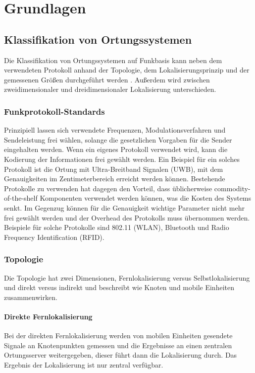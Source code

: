 \chapter{Grundlagen}
\label{ch:Grundlagen}

\section{Klassifikation von Ortungssystemen}
\label{ch:Einleitung:sec:Ortungssysteme}
Die Klassifikation von Ortungssystemen auf Funkbasis kann neben dem verwendeten Protokoll anhand der Topologie, dem Lokalisierungsprinzip und der gemessenen Größen durchgeführt werden \cite{liu2007survey}.
Außerdem wird zwischen zweidimensionaler und dreidimensionaler Lokalisierung unterschieden.

\subsection{Funkprotokoll-Standards}
Prinzipiell lassen sich verwendete Frequenzen, Modulationsverfahren und Sendeleistung frei wählen, solange die gesetzlichen Vorgaben für die Sender eingehalten werden. Wenn ein eigenes Protokoll verwendet wird, kann die Kodierung der Informationen frei gewählt werden. 
Ein Beispiel für ein solches Protokoll ist die Ortung mit Ultra-Breitband Signalen (UWB), mit dem Genauigkeiten im Zentimeterbereich erreicht werden können. Bestehende Protokolle zu verwenden hat dagegen den Vorteil, dass üblicherweise commodity-of-the-shelf Komponenten verwendet werden können, was die Kosten des Systems senkt. Im Gegenzug können für die Genauigkeit wichtige Parameter nicht mehr frei gewählt werden und der Overhead des Protokolls muss übernommen werden. Beispiele für solche Protokolle sind 802.11 (WLAN), Bluetooth und Radio Frequency Identification (RFID).

\subsection{Topologie}
Die Topologie hat zwei Dimensionen, Fernlokalisierung versus Selbstlokalisierung und direkt versus indirekt und beschreibt wie Knoten und mobile Einheiten zusammenwirken. \\

\subsubsection{Direkte Fernlokalisierung} 
Bei der direkten Fernlokalisierung werden von mobilen Einheiten gesendete Signale an Knotenpunkten gemessen und die Ergebnisse an einen zentralen Ortungsserver weitergegeben, dieser führt dann die Lokalisierung durch. Das Ergebnis der Lokalisierung ist nur zentral verfügbar. \\

